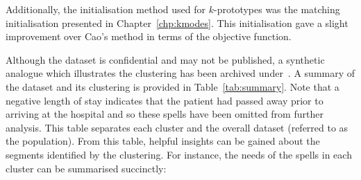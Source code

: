 Additionally, the initialisation method used for \(k\)-prototypes was the
matching initialisation presented in Chapter~\ref{chp:kmodes}. This
initialisation gave a slight improvement over Cao's method in terms of the
objective function.

\begin{table}
    \centering
    \resizebox{\textwidth}{!}{%
        
    }\caption{%
        A summary of clinical and condition-specific characteristics for each
        cluster and the population
    }\label{tab:summary}
\end{table}

Although the dataset is confidential and may not be published, a synthetic
analogue which illustrates the clustering has been archived
under~. A summary of the dataset and its clustering
is provided in Table~\ref{tab:summary}. Note that a negative length of stay
indicates that the patient had passed away prior to arriving at the hospital and
so these spells have been omitted from further analysis. This table separates
each cluster and the overall dataset (referred to as the population). From this
table, helpful insights can be gained about the segments identified by the
clustering. For instance, the needs of the spells in each cluster can be
summarised succinctly:

